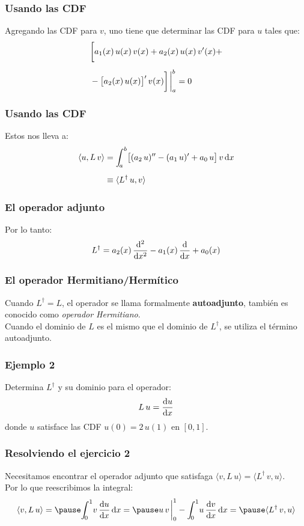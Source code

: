 \documentclass[12pt]{beamer}
\begin{document}
\begin{frame}
\frametitle{Usando las CDF}
Agregando las CDF para $v$, \pause uno tiene que determinar las CDF para $u$ tales que:
\pause
\begin{align*}
&\bigg[ a_{1}(x) \, u(x) \, v(x) + a_{2}(x) \, u(x) \, \pderivada{v}(x) + \\[0.5em]
&- \big[ a_{2}(x) \, u(x) \big]^{\prime} \, v(x) \bigg] \eval_{a}^{b} = 0
\end{align*}
\end{frame}
\begin{frame}
\frametitle{Usando las CDF}
Estos nos lleva a:
\pause
\begin{align*}
\langle u , L \, v \rangle &= \scaleint{5ex}_{\bs a}^{b}  \big[ (a_{2} \, u)^{\prime \prime} - (a_{1} \, u)^{\prime} + a_{0} \, u \big] \, v \dd{x} \\[0.5em]
&\equiv \langle L^{\dagger} \, u, v \rangle 
\end{align*}
\end{frame}
\begin{frame}
\frametitle{El operador adjunto}
Por lo tanto:
\pause
\begin{align}
L^{\dagger} = a_{2}(x) \, \dv[2]{x} - a_{1}(x) \, \dv{x} + a_{0}(x)
\label{eq:ecuacion_04_20}
\end{align}
\end{frame}
\begin{frame}
\frametitle{El operador Hermitiano/Hermítico}
Cuando $L^{\dagger} = L$, \pause el operador se llama formalmente \textbf{autoadjunto}, también es conocido como \emph{operador Hermitiano}.
\\
\bigskip
\pause
Cuando el dominio de $L$ es el mismo que el dominio de $L^{\dagger}$, se utiliza el término autoadjunto.
\end{frame}
\begin{frame}
\frametitle{Ejemplo 2}
Determina $L^{\dagger}$ y su dominio para el operador:
\pause
\begin{align*}
L \, u = \dv{u}{x}
\end{align*}
donde $u$ satisface las CDF $u(0) = 2 \, u(1)$ en $[0, 1]$.
\end{frame}
\begin{frame}
\frametitle{Resolviendo el ejercicio 2}
Necesitamos encontrar el operador adjunto que satisfaga $\langle v, L \, u \rangle = \langle L^{\dagger} \, v, u \rangle$.
\\
\bigskip
\pause  
Por lo que reescribimos la integral:
\pause
\begin{eqnarray*}
\langle v, L \, u \rangle = \pause \scaleint{5ex}_{\bs 0}^{1} v \, \dv{u}{x} \dd{x} = \pause u \, v \eval_{0}^{1} - \scaleint{5ex}_{\bs 0}^{1} u \, \dv{v}{x} \dd{x} = \pause \langle L^{\dagger} \, v, u \rangle
\end{eqnarray*}
\end{frame}
\end{document}
